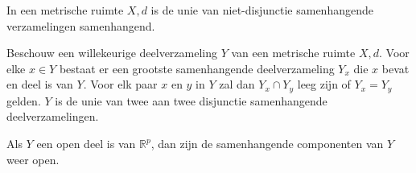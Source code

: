 \documentclass[main.tex]{subfiles}
\begin{document}
\begin{bpr}
  In een metrische ruimte $X,d$ is de unie van niet-disjunctie samenhangende verzamelingen samenhangend.
\end{bpr}

\begin{bpr}
  Beschouw een willekeurige deelverzameling $Y$ van een metrische ruimte $X,d$.
  Voor elke $x\in Y$ bestaat er een grootste samenhangende deelverzameling $Y_{x}$ die $x$ bevat en deel is van $Y$.
  Voor elk paar $x$ en $y$ in $Y$ zal dan $Y_{x} \cap Y_{y}$ leeg zijn of $Y_{x} = Y_{y}$ gelden.
  $Y$ is de unie van twee aan twee disjunctie samenhangende deelverzamelingen.
\end{bpr}

\begin{bpr}
 Als $Y$ een open deel is van $\mathbb{R}^{p}$, dan zijn de samenhangende componenten van $Y$ weer open.
\end{bpr}
\end{document}
